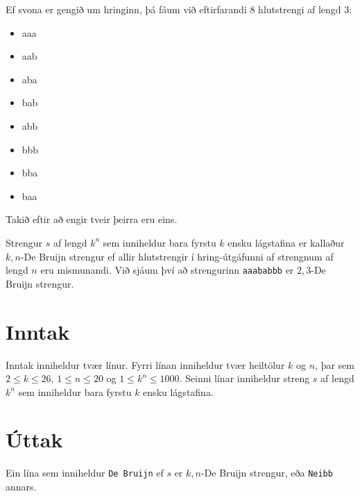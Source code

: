 Ef svona er gengið um hringinn, þá fáum við eftirfarandi $8$ hlutstrengi af
lengd $3$:
\begin{itemize}
    \item aaa
    \item aab
    \item aba
    \item bab
    \item abb
    \item bbb
    \item bba
    \item baa
\end{itemize}

Takið eftir að engir tveir þeirra eru eins.

Strengur $s$ af lengd $k^n$ sem inniheldur bara fyrstu $k$ ensku lágstafina er
kallaður $k,n$-De Bruijn strengur ef allir hlutstrengir í hring-útgáfunni af
strengnum af lengd $n$ eru mismunandi. Við sjáum því að strengurinn
\texttt{aaababbb} er $2,3$-De Bruijn strengur.

\section*{Inntak}
Inntak inniheldur tvær línur. Fyrri línan inniheldur tvær heiltölur $k$ og $n$,
þar sem $2 \leq k \leq 26$, $1 \leq n \leq 20$ og $1 \leq k^n \leq 1000$.
Seinni línar inniheldur streng $s$ af lengd $k^n$ sem inniheldur bara fyrstu
$k$ ensku lágstafina.

\section*{Úttak}
Ein lína sem inniheldur \texttt{De Bruijn} ef $s$ er $k,n$-De Bruijn strengur,
eða \texttt{Neibb} annars.

